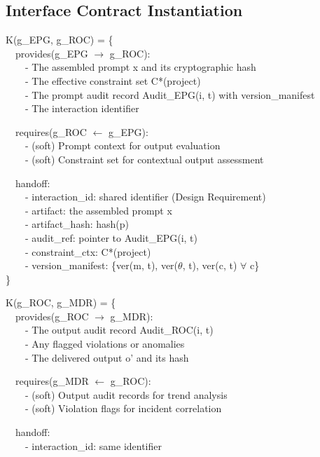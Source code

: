 \subsection{Interface Contract Instantiation}


\begin{claddisp}
K(g\_EPG, g\_ROC) = \{\\
~~provides(g\_EPG $\to$ g\_ROC):\\
~~~~- The assembled prompt x and its cryptographic hash\\
~~~~- The effective constraint set C*(project)\\
~~~~- The prompt audit record Audit\_EPG(i, t) with version\_manifest\\
~~~~- The interaction identifier
\par\smallskip
~~requires(g\_ROC $\leftarrow$ g\_EPG):\\
~~~~- (soft) Prompt context for output evaluation\\
~~~~- (soft) Constraint set for contextual output assessment
\par\smallskip
~~handoff:\\
~~~~- interaction\_id: shared identifier (Design Requirement)\\
~~~~- artifact: the assembled prompt x\\
~~~~- artifact\_hash: hash(p)\\
~~~~- audit\_ref: pointer to Audit\_EPG(i, t)\\
~~~~- constraint\_ctx: C*(project)\\
~~~~- version\_manifest: \{ver(m, t), ver($\theta$, t), ver(c, t) $\forall$ c\}\\
\}
\par\smallskip
K(g\_ROC, g\_MDR) = \{\\
~~provides(g\_ROC $\to$ g\_MDR):\\
~~~~- The output audit record Audit\_ROC(i, t)\\
~~~~- Any flagged violations or anomalies\\
~~~~- The delivered output o' and its hash
\par\smallskip
~~requires(g\_MDR $\leftarrow$ g\_ROC):\\
~~~~- (soft) Output audit records for trend analysis\\
~~~~- (soft) Violation flags for incident correlation
\par\smallskip
~~handoff:\\
~~~~- interaction\_id: same identifier\\

\end{claddisp}
